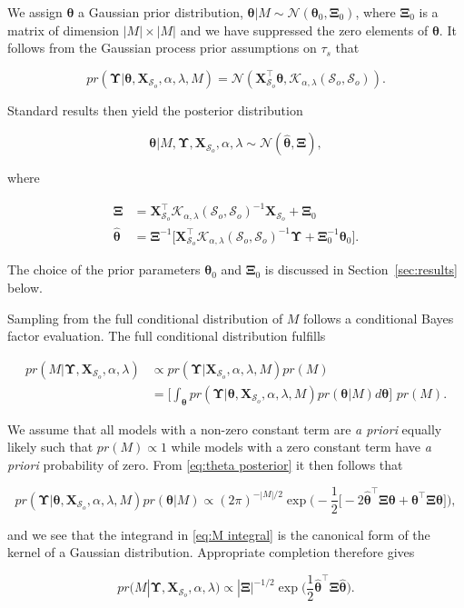 \documentclass[11pt,english]{article}
\newcommand{\bs}[1]{\boldsymbol{#1}}
\newcommand{\mc}[1]{\mathcal{#1}}
\newcommand{\bl}{\begin{linenomath}}
\newcommand{\el}{\end{linenomath}}
\begin{document}
We assign $\bs{\theta}$ a Gaussian prior distribution,  $\bs{\theta}| M \sim \mc{N}(\bs{\theta}_0, \bs{\Xi}_0)$, where $\bs{\Xi}_0$ is a matrix of dimension $|M| \times |M|$ and we have suppressed the zero elements of $\bs{\theta}$. It follows from the Gaussian process prior assumptions on $\tau_s$ that 
\bl\[
pr(\bs{\Upsilon}|\bs{\theta},\bs{X}_{\mc{S}_o}, \alpha, \lambda, M) = \mc{N}(\bs{X}^\top_{\mc{S}_o} \bs{\theta} , \mc{K}_{\alpha, \lambda}(\mc{S}_o,\mc{S}_o)).
\]\el
Standard results \citep[see e.g.][]{Hoff2009} then yield the posterior distribution 
\bl\begin{equation}\label{eq:theta posterior}
\bs{\theta}|M, \bs{\Upsilon}, \bs{X}_{\mc{S}_o}, \alpha, \lambda \sim  \mc{N}(\hat{\bs{\theta}}, \bs{\Xi}), 
\end{equation}\el
where
\bl\begin{align*}
\bs{\Xi} &= \bs{X}^\top_{\mc{S}_o} \mc{K}_{\alpha, \lambda}(\mc{S}_o,\mc{S}_o)^{-1} \bs{X}_{\mc{S}_o} + \bs{\Xi}_0\\
\hat{\bs{\theta}} &= \bs{\Xi}^{-1} \big[ \bs{X}^\top_{\mc{S}_o} \mc{K}_{\alpha,\lambda}(\mc{S}_o,\mc{S}_o)^{-1}\bs{\Upsilon} + \bs{\Xi}_0^{-1} \bs{\theta}_0 \big].
\end{align*}\el
The choice of the prior parameters $\bs{\theta}_0$ and $\bs{\Xi}_0$ is discussed in Section~\ref{sec:results} below.  

Sampling from the full conditional distribution of $M$ follows a conditional Bayes factor evaluation.  The full conditional distribution fulfills 
\bl\begin{align}
  pr(M|\bs{\Upsilon}, \bs{X}_{\mc{S}_o}, \alpha, \lambda) &\propto pr(\bs{\Upsilon}| \bs{X}_{\mc{S}_o}, \alpha, \lambda, M)pr(M) \nonumber \\
&= \Big[ \int_{\bs{\theta}} pr(\bs{\Upsilon}| \bs{\theta}, \bs{X}_{\mc{S}_o}, \alpha, \lambda, M)pr(\bs{\theta}|M)d\bs{\theta} \Big] \, \, pr(M). \label{eq:M integral}
\end{align}\el
We assume that all models with a non-zero constant term are {\em a priori} equally likely such that $pr(M) \propto 1$ while models with a zero constant term have {\em a priori} probability of zero. From \eqref{eq:theta posterior} it then follows that 
\bl $$
pr(\bs{\Upsilon}| \bs{\theta}, \bs{X}_{\mc{S}_o}, \alpha, \lambda, M)pr(\bs{\theta}|M) \propto (2\pi)^{-|M|/2}\exp\Big(-\frac{1}{2}\big[-2 \hat{\bs{\theta}}^\top \bs{\Xi}  \bs{\theta} + \bs{\theta}^\top \bs{\Xi} \bs{\theta}\big]\Big), 
$$\el
and we see that the integrand in \eqref{eq:M integral} is the canonical form of the kernel of a Gaussian distribution. Appropriate completion therefore gives
\bl $$
pr(M|\bs{\Upsilon}, \bs{X}_{\mc{S}_o}, \alpha, \lambda ) \propto |\bs{\Xi}|^{-1/2}\exp\Big(\frac{1}{2} \hat{\bs{\theta}}^\top \bs{\Xi}\hat{\bs{\theta}}\Big). 
$$ \el
\end{document}
